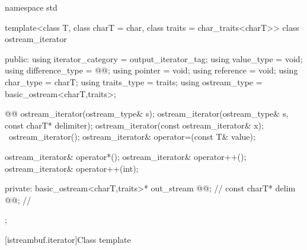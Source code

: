 \begin{codeblock}
namespace std {
  template<class T, class charT = char, class traits = char_traits<charT>>
  class ostream_iterator {
  public:
    using iterator_category = output_iterator_tag;
    using value_type        = void;
    using difference_type   = @@;
    using pointer           = void;
    using reference         = void;
    using char_type         = charT;
    using traits_type       = traits;
    using ostream_type      = basic_ostream<charT,traits>;

    @@
    ostream_iterator(ostream_type& s);
    ostream_iterator(ostream_type& s, const charT* delimiter);
    ostream_iterator(const ostream_iterator& x);
    ~ostream_iterator();
    ostream_iterator& operator=(const T& value);

    ostream_iterator& operator*();
    ostream_iterator& operator++();
    ostream_iterator& operator++(int);

  private:
    basic_ostream<charT,traits>* out_stream @@;  // \expos
    const charT* delim @@;                       // \expos
  };
}
\end{codeblock}

[istreambuf.iterator]{Class template }


